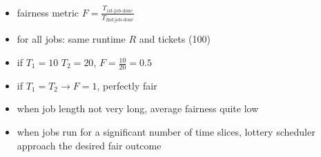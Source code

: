 \begin{minipage}{.55\linewidth}
  \flushleft
  \begin{itemize}
  \item fairness metric $F = \frac{T_{\text{1st-job-done}}}{T_{\text{2nd-job-done}}}$
  \item for all jobs: same runtime $R$ and tickets (100)
  \item if $T_1 = 10$ $T_2 = 20$, $F = \frac{10}{20} = 0.5$
  \item if $T_1 = T_2 \to F = 1$, perfectly fair
  \item when job length not very long, average fairness quite low
  \item when jobs run for a significant number of time slices, lottery scheduler approach the desired fair outcome
  \end{itemize}
\end{minipage}
